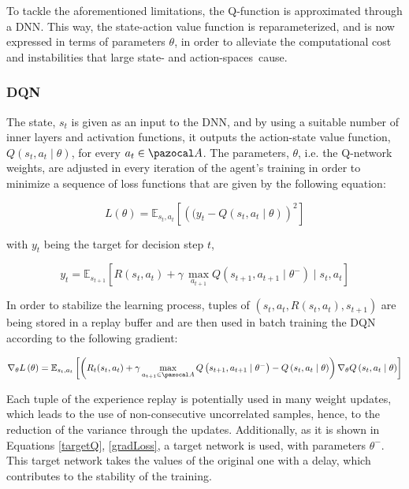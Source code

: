 To tackle the aforementioned limitations, the Q-function is approximated through a \acrfull{DNN}. This way, the state-action value function is reparameterized, and is now expressed in terms of parameters $\theta$, in order to alleviate the computational cost and instabilities that large state- and action-spaces~cause. \\

\subsubsection{\acrfull{DQN}}

The state, $s_t$ is given as an input to the \gls{DNN}, and by using a suitable number of inner layers and activation functions, it outputs the action-state value function, $Q(s_t, a_t\mid \theta)$, for every $a_t \in \ccal{A}$. The parameters, $\theta$, i.e. the Q-network weights, are adjusted in every iteration of the agent's training in order to minimize a sequence of loss functions that are given by the following equation:

\begin{equation}
    L(\theta) = \mathbb{E}_{s_t, a_t}\left[ \left( (y_t - Q(s_t, a_t\mid \theta ) \right) ^2 \right]
\end{equation}

with $y_t$ being the target for decision step $t$,

\begin{equation}
    y_t = \mathbb{E}_{s_{t+1}}\left[ R(s_t, a_t) + \gamma \, \max _{a_{t+1}} Q(s_{t+1}, a_{t+1}\mid \theta ^-) \mid s_t, a_t \right] \label{targetQ}
\end{equation}

In order to stabilize the learning process, tuples of $(s_t, a_t, R(s_t, a_t), s_{t+1})$ are being stored in a replay buffer and are then used in batch training the \gls{DQN} according to the following gradient:

\begin{equation}
    \nabla_{\theta} L\left(\theta \right)=\mathbb{E}_{s_t, a_t}\left[\left(R_t(s_t,a_t)+\gamma \max _{a_{t+1}\in \ccal{A}} Q\left(s_{t+1}, a_{t+1} \mid \theta ^- \right) -Q\left(s_t, a_t \mid \theta \right)\right) \nabla_{\theta} Q\left(s_t, a_t \mid \theta \right)\right] \label{gradLoss}
\end{equation}

Each tuple of the experience replay is potentially used in many weight updates, which leads to the use of non-consecutive uncorrelated samples, hence, to the reduction of the variance through the updates. Additionally, as it is shown in Equations \ref{targetQ}, \ref{gradLoss}, a target network is used, with parameters $\theta ^-$. This target network takes the values of the original one with a delay, which contributes to the stability of the training.\\

